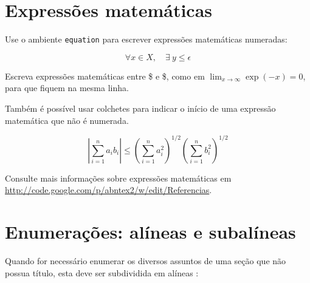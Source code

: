 \section{Expressões matemáticas}

Use o ambiente \texttt{equation} para escrever
expressões matemáticas numeradas:

\begin{equation}
  \forall x \in X, \quad \exists \: y \leq \epsilon
\end{equation}

Escreva expressões matemáticas entre \$ e \$, como em $ \lim_{x \to \infty}
\exp(-x) = 0 $, para que fiquem na mesma linha.

Também é possível usar colchetes para indicar o início de uma expressão
matemática que não é numerada.

\[
\left|\sum_{i=1}^n a_ib_i\right|
\le
\left(\sum_{i=1}^n a_i^2\right)^{1/2}
\left(\sum_{i=1}^n b_i^2\right)^{1/2}
\]

Consulte mais informações sobre expressões matemáticas em
\url{http://code.google.com/p/abntex2/w/edit/Referencias}.

\section{Enumerações: alíneas e subalíneas}

Quando for necessário enumerar
os diversos assuntos de uma seção que não possua título, esta deve ser
subdividida em alíneas \cite[4.2]{NBR6024:2012}:

